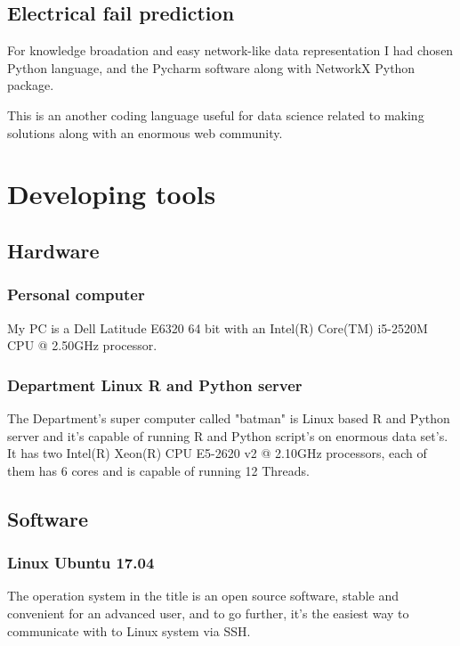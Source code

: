 		\subsection{Electrical fail prediction}
For knowledge broadation and easy network-like data representation I had chosen Python language, and the Pycharm software \cite{PyCharm} along with NetworkX Python package\cite{NetworkX}.

This is an another coding language useful for data science related to making solutions along with an enormous web community.
	\section{Developing tools}
		\subsection{Hardware}
			\subsubsection{Personal computer}
My PC is a Dell Latitude E6320 64 bit with an Intel(R) Core(TM) i5-2520M CPU @ 2.50GHz processor.
\cite{Latitude}
			\subsubsection{Department Linux R and Python server}
The Department's super computer called "batman" is Linux based R and Python server and it's capable of running R and Python script's on enormous data set's. It has two Intel(R) Xeon(R) CPU E5-2620 v2 @ 2.10GHz processors, each of them has 6 cores and is capable of running 12 Threads.
\cite{Batman}
		\subsection{Software}
			\subsubsection{Linux Ubuntu 17.04}
The operation system in the title is an open source software, stable and convenient for an advanced user, and to go further, it's the easiest way to communicate with to Linux system via SSH.
\cite{Ubuntu}
